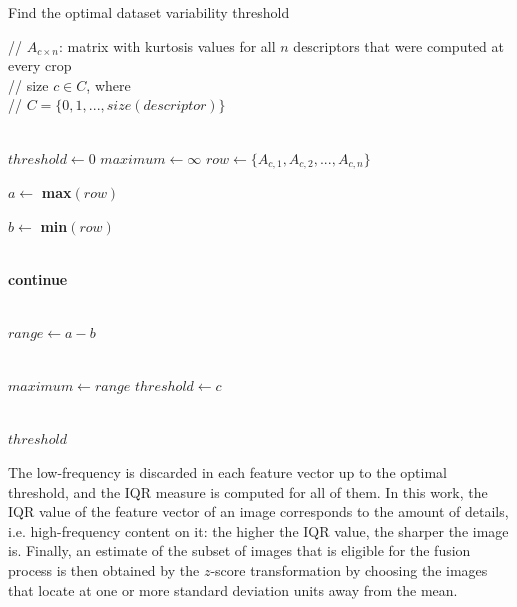 \begin{algorithm}[ht]
	\caption{Find the optimal dataset variability threshold}
	\label{alg:cut_threshold}
	\begin{algorithmic}[1]
 		\State // $A_{c \times n}$: matrix with kurtosis values for all $n$ descriptors that were computed at every crop \\ // size $c \in C$, where \\ // $C = \{0,1,...,size(descriptor)\}$ 
		
		\\
		
		\State $threshold \gets 0$
		\State $maximum \gets \infty$
		\State $row \gets \{A_{c,1},A_{c,2},...,A_{c,n}\}$ 
		
		\State $a \gets$ \textbf{max}$(row)$
		
		\State $b \gets$ \textbf{min}$(row)$
		
		\\
		
		    \State \textbf{continue}
		\EndIf
		
		\\
		
		\State $range \gets a - b$
		
		\\
		
		    \State $maximum \gets range$
		    \State $threshold \gets c$
		\EndIf
		
		\EndFor
		\\
		\Return $threshold$
	\end{algorithmic}
\end{algorithm}

The low-frequency is discarded in each feature vector up to the optimal threshold, and the IQR measure is computed for all of them. In this work, the IQR value of the feature vector of an image corresponds to the amount of details, i.e. high-frequency content on it: the higher the IQR value, the sharper the image is. Finally, an estimate of the subset of images that is eligible for the fusion process is then obtained by the $z$-score transformation by choosing the images that locate at one or more standard deviation units away from the mean.